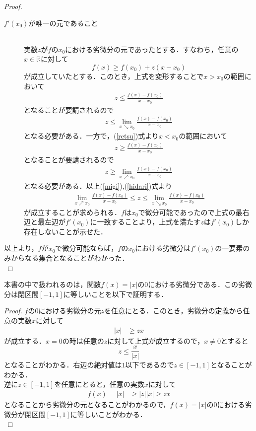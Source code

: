 \documentclass{jsarticle}
\theoremstyle{definition}
\theoremstyle{mystyle} %
\begin{document}
\begin{proof}
\begin{description}
\item[$f'(x_0)$が唯一の元であること]\mbox{}\\
実数$z$が$f$の$x_0$における劣微分の元であったとする．すなわち，任意の$x\in\mathbb{R}$に対して
\begin{equation}
\label{retsu}
f(x)\geq f(x_0)+z(x-x_0)
\end{equation}
が成立していたとする．このとき，上式を変形することで$x>x_0$の範囲において
\begin{align*}
z\leq \frac{f(x)-f(x_0)}{x-x_0}
\end{align*}
となることが要請されるので
\begin{align}
\label{migi}
z\leq \lim_{x\searrow x_0}\frac{f(x)-f(x_0)}{x-x_0}
\end{align}
となる必要がある．一方で，(\ref{retsu})式より$x<x_0$の範囲において
\begin{align*}
z\geq \frac{f(x)-f(x_0)}{x-x_0}
\end{align*}
となることが要請されるので
\begin{align}
\label{hidari}
z\geq \lim_{x\nearrow x_0}\frac{f(x)-f(x_0)}{x-x_0}
\end{align}
となる必要がある．以上(\ref{migi}),(\ref{hidari})式より
\begin{align*}
\lim_{x\nearrow x_0}\frac{f(x)-f(x_0)}{x-x_0}\leq z\leq \lim_{x\searrow x_0}\frac{f(x)-f(x_0)}{x-x_0}
\end{align*}
が成立することが求められる．$f$は$x_0$で微分可能であったので上式の最右辺と最左辺が$f'(x_0)$に一致することより，上式を満たす$z$は$f'(x_0)$しか存在しないことが示せた．
\end{description}
以上より，$f$が$x_0$で微分可能ならば，$f$の$x_0$における劣微分は$f'(x_0)$の一要素のみからなる集合となることがわかった．\\
\end{proof}

本書の中で扱われるのは，関数$f(x)=|x|$の$0$における劣微分である．この劣微分は閉区間$[-1,1]$に等しいことを以下で証明する．\\

\begin{proof}
$f$の$0$における劣微分の元$z$を任意にとる．このとき，劣微分の定義から任意の実数$x$に対して
\begin{align*}
|x|&\geq zx
\end{align*}
が成立する．$x=0$の時は任意の$z$に対して上式が成立するので，$x\neq 0$とすると
$$z\leq \frac{x}{|x|}$$
となることがわかる．右辺の絶対値は$1$以下であるので$z\in[-1,1]$となることがわかる．\\
逆に$z\in [-1,1]$を任意にとると，任意の実数$x$に対して
\begin{align*}
f(x)=|x|&\geq |z||x|\geq zx
\end{align*}
となることから劣微分の元となることがわかるので，$f(x)=|x|$の$0$における劣微分が閉区間$[-1,1]$に等しいことがわかる．\\
\end{proof}
\end{document}
